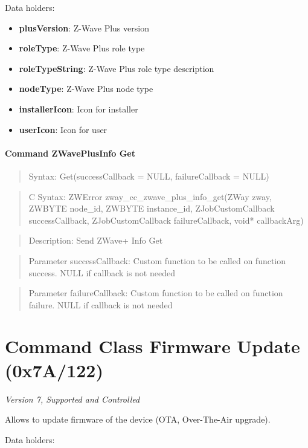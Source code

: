 \noindent
Data holders:

\begin{itemize}
\item \textbf{plusVersion}: Z-Wave Plus version
\item \textbf{roleType}: Z-Wave Plus role type
\item \textbf{roleTypeString}: Z-Wave Plus role type description
\item \textbf{nodeType}: Z-Wave Plus node type
\item \textbf{installerIcon}: Icon for installer
\item \textbf{userIcon}: Icon for user
\end{itemize}

\paragraph{Command ZWavePlusInfo Get}
\begin{quote}Syntax: Get(successCallback = NULL, failureCallback = NULL)\end{quote}
\begin{quote}C Syntax: ZWError zway\_cc\_zwave\_plus\_info\_get(ZWay zway, ZWBYTE node\_id, ZWBYTE instance\_id, ZJobCustomCallback successCallback, ZJobCustomCallback failureCallback, void* callbackArg)\end{quote}
\begin{quote}Description: Send ZWave+ Info Get\end{quote}
\begin{quote}Parameter successCallback: Custom function to be called on function success. NULL if callback is not needed\end{quote}
\begin{quote}Parameter failureCallback: Custom function to be called on function failure. NULL if callback is not needed\end{quote}



\section{Command Class Firmware Update (0x7A/122)}

\textit{Version 7, Supported and Controlled}
\newline

Allows to update firmware of the device (OTA, Over-The-Air upgrade).
\newline

\noindent
Data holders:

